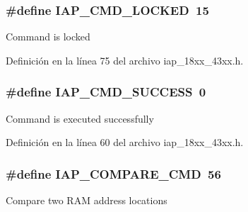 \subsubsection[{\texorpdfstring{I\+A\+P\+\_\+\+C\+M\+D\+\_\+\+L\+O\+C\+K\+ED}{IAP_CMD_LOCKED}}]{\setlength{\rightskip}{0pt plus 5cm}\#define I\+A\+P\+\_\+\+C\+M\+D\+\_\+\+L\+O\+C\+K\+ED~15}\hypertarget{group___i_a_p__18_x_x__43_x_x_gafdceac1acd5c460094011136c08574a4}{}\label{group___i_a_p__18_x_x__43_x_x_gafdceac1acd5c460094011136c08574a4}
Command is locked 

Definición en la línea 75 del archivo iap\+\_\+18xx\+\_\+43xx.\+h.

\subsubsection[{\texorpdfstring{I\+A\+P\+\_\+\+C\+M\+D\+\_\+\+S\+U\+C\+C\+E\+SS}{IAP_CMD_SUCCESS}}]{\setlength{\rightskip}{0pt plus 5cm}\#define I\+A\+P\+\_\+\+C\+M\+D\+\_\+\+S\+U\+C\+C\+E\+SS~0}\hypertarget{group___i_a_p__18_x_x__43_x_x_ga6855b3bb97689d746eff1f27dde58fc5}{}\label{group___i_a_p__18_x_x__43_x_x_ga6855b3bb97689d746eff1f27dde58fc5}
Command is executed successfully 

Definición en la línea 60 del archivo iap\+\_\+18xx\+\_\+43xx.\+h.

\subsubsection[{\texorpdfstring{I\+A\+P\+\_\+\+C\+O\+M\+P\+A\+R\+E\+\_\+\+C\+MD}{IAP_COMPARE_CMD}}]{\setlength{\rightskip}{0pt plus 5cm}\#define I\+A\+P\+\_\+\+C\+O\+M\+P\+A\+R\+E\+\_\+\+C\+MD~56}\hypertarget{group___i_a_p__18_x_x__43_x_x_gaa63a66d010441cd1b5837742455cf075}{}\label{group___i_a_p__18_x_x__43_x_x_gaa63a66d010441cd1b5837742455cf075}
Compare two R\+AM address locations 

